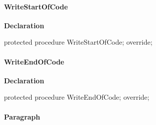 \documentclass{report}
\newif\ifpdf
\begin{document}
\paragraph*{WriteStartOfCode}\hspace*{\fill}

\label{PasDoc_GenLatex.TTexDocGenerator-WriteStartOfCode}
\begin{list}{}{
\setlength{\itemindent}{0cm}
\setlength{\listparindent}{0cm}
\setlength{\leftmargin}{\evensidemargin}
\addtolength{\leftmargin}{\tmplength}
\settowidth{\labelsep}{X}
\addtolength{\leftmargin}{\labelsep}
\setlength{\labelwidth}{\tmplength}
}
\item[\textbf{Declaration}\hfill]
\ifpdf
\begin{flushleft}
\fi
\begin{ttfamily}
protected procedure WriteStartOfCode; override;\end{ttfamily}

\ifpdf
\end{flushleft}
\fi

\end{list}
\paragraph*{WriteEndOfCode}\hspace*{\fill}

\label{PasDoc_GenLatex.TTexDocGenerator-WriteEndOfCode}
\begin{list}{}{
\setlength{\itemindent}{0cm}
\setlength{\listparindent}{0cm}
\setlength{\leftmargin}{\evensidemargin}
\addtolength{\leftmargin}{\tmplength}
\settowidth{\labelsep}{X}
\addtolength{\leftmargin}{\labelsep}
\setlength{\labelwidth}{\tmplength}
}
\item[\textbf{Declaration}\hfill]
\ifpdf
\begin{flushleft}
\fi
\begin{ttfamily}
protected procedure WriteEndOfCode; override;\end{ttfamily}

\ifpdf
\end{flushleft}
\fi

\end{list}
\paragraph*{Paragraph}\hspace*{\fill}
\end{document}
